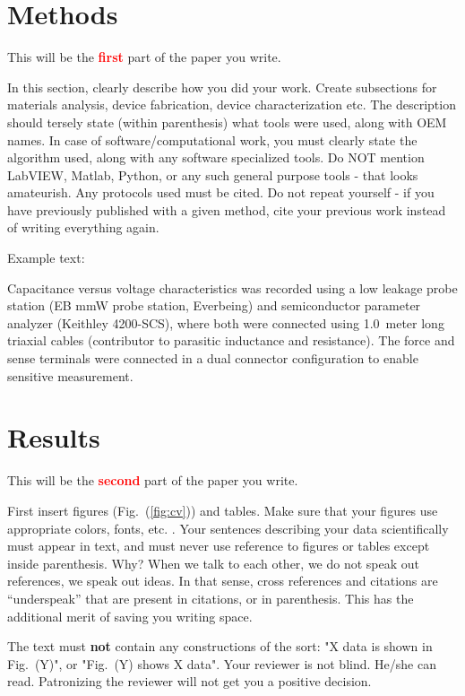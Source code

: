 \documentclass[12 pt]{article}
\begin{document}
\section{Methods}
This will be the \textbf{\Huge \textcolor{red}{first}} part of the paper you write.

In this section, clearly describe how you did your work. Create subsections for materials analysis, device fabrication, device characterization etc. The description should tersely state (within parenthesis) what tools were used, along with OEM names. In case of software/computational work, you must clearly state the algorithm used, along with any software specialized tools. Do NOT mention LabVIEW, Matlab, Python, or any such general purpose tools - that looks amateurish. Any protocols used must be cited. Do not repeat yourself - if you have previously published with a given method, cite your previous work instead of writing everything again.

Example text:

Capacitance versus voltage characteristics was recorded using a low leakage probe station (EB mmW probe station, Everbeing) and semiconductor parameter analyzer (Keithley 4200-SCS), where both were connected using \SI{1.0}{meter} long triaxial cables (contributor to parasitic inductance and resistance). The force and sense terminals were connected in a dual connector configuration to enable sensitive measurement.

\section{Results}
\label{sec:results}

This will be the \textbf{\Huge \textcolor{red}{second}} part of the paper you write.

First insert figures (Fig.~(\ref{fig:cv})) and tables. Make sure that your figures use appropriate colors, fonts, etc. \cite{mcnames:2006}. Your sentences describing your data scientifically must appear in text, and must never use reference to figures or tables except inside parenthesis. Why? When we talk to each other, we do not speak out references, we speak out ideas. In that sense, cross references and citations are ``underspeak'' that are present in citations, or in parenthesis. This has the additional merit of saving you writing space.

The text must \textbf{not} contain any constructions of the sort: "X data is shown in Fig.~(Y)", or "Fig.~(Y) shows X data". Your reviewer is not blind. He/she can read. Patronizing the reviewer will not get you a positive decision.
\end{document}
